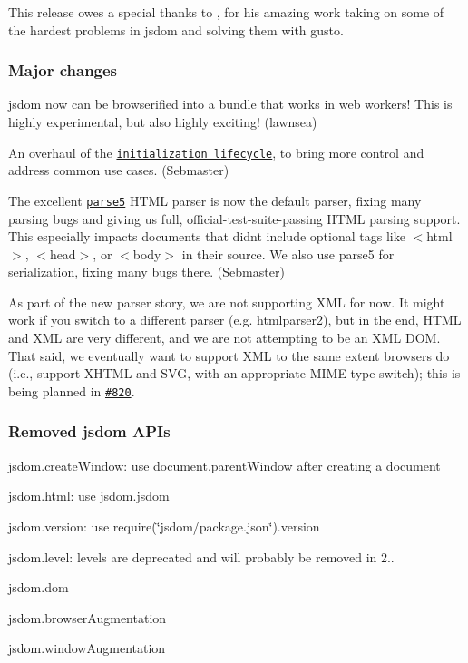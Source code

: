 This release owes a special thanks to \href{https://github.com/Sebmaster}{\tt }, for his amazing work taking on some of the hardest problems in jsdom and solving them with gusto.

\subsubsection*{Major changes}


\begin{DoxyItemize}
\item jsdom now can be browserified into a bundle that works in web workers! This is highly experimental, but also highly exciting! (lawnsea)
\item An overhaul of the \href{https://github.com/tmpvar/jsdom#initialization-lifecycle}{\tt initialization lifecycle}, to bring more control and address common use cases. (Sebmaster)
\item The excellent \href{https://npmjs.org/package/parse5}{\tt parse5} H\+T\+ML parser is now the default parser, fixing many parsing bugs and giving us full, official-\/test-\/suite-\/passing H\+T\+ML parsing support. This especially impacts documents that didn\textquotesingle{}t include optional tags like {\ttfamily $<$html$>$}, {\ttfamily $<$head$>$}, or {\ttfamily $<$body$>$} in their source. We also use parse5 for serialization, fixing many bugs there. (Sebmaster)
\item As part of the new parser story, we are not supporting X\+ML for now. It might work if you switch to a different parser (e.\+g. htmlparser2), but in the end, H\+T\+ML and X\+ML are very different, and we are not attempting to be an X\+ML D\+OM. That said, we eventually want to support X\+ML to the same extent browsers do (i.\+e., support X\+H\+T\+ML and S\+VG, with an appropriate M\+I\+ME type switch); this is being planned in \href{https://github.com/tmpvar/jsdom/issues/820}{\tt \#820}.
\end{DoxyItemize}

\subsubsection*{Removed jsdom A\+P\+Is}


\begin{DoxyItemize}
\item {\ttfamily jsdom.\+create\+Window}\+: use {\ttfamily document.\+parent\+Window} after creating a document
\item {\ttfamily jsdom.\+html}\+: use {\ttfamily jsdom.\+jsdom}
\item {\ttfamily jsdom.\+version}\+: use {\ttfamily require(\char`\"{}jsdom/package.\+json\char`\"{}).version}
\item {\ttfamily jsdom.\+level}\+: levels are deprecated and will probably be removed in 2..
\item {\ttfamily jsdom.\+dom}
\item {\ttfamily jsdom.\+browser\+Augmentation}
\item {\ttfamily jsdom.\+window\+Augmentation}
\end{DoxyItemize}

